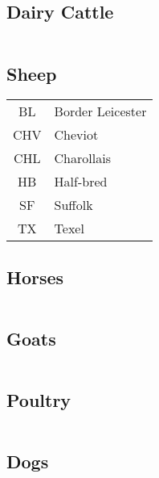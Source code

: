\documentclass[a4paper,11pt]{report}
\begin{document}
	\subsection*{Dairy Cattle}
	\begin{tabular}{cl}
		
	\end{tabular}
	
	\subsection*{Sheep}
	\begin{tabular}{cl}
		BL & Border Leicester \\
		CHV & Cheviot \\
		CHL & Charollais \\
		HB & Half-bred \\
		SF & Suffolk \\
		TX & Texel \\
	\end{tabular}

	\subsection*{Horses}
	\begin{tabular}{cl}
		
	\end{tabular}

	\subsection*{Goats}
	\begin{tabular}{cl}
		
	\end{tabular}

	\subsection*{Poultry}
	\begin{tabular}{cl}
		
	\end{tabular}

	\subsection*{Dogs}
	\begin{tabular}{cl}
		
	\end{tabular}
\end{document}
